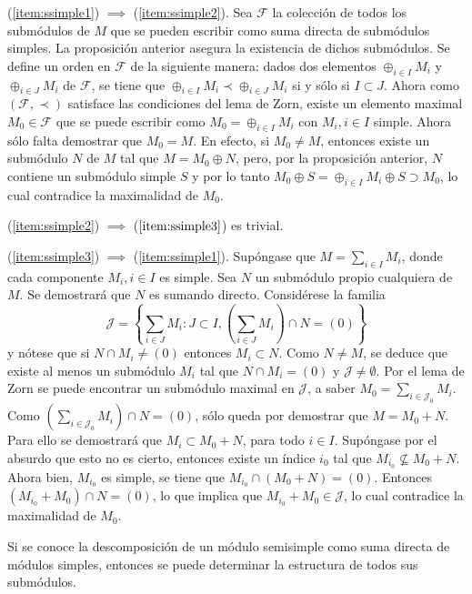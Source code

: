 \begin{proof*}
(\ref{item:ssimple1}) $\implies$ (\ref{item:ssimple2}). Sea $\mathcal{F}$ la colección de todos los submódulos de $M$ que se pueden escribir como suma directa de submódulos simples. La proposición anterior asegura la existencia de dichos submódulos. Se define un orden en $\mathcal{F}$ de la siguiente manera: dados dos elementos $\oplus_{i \in I}M_i$ y $\oplus_{i \in J}M_i$ de $\mathcal{F}$, se tiene que $\oplus_{i \in I}M_i  \prec \oplus_{i \in J}M_i$ si y sólo si $I \subset J$. 
Ahora como $(\mathcal{F, \prec})$ satisface las condiciones del lema de Zorn, existe un elemento maximal $M_0 \in \mathcal{F}$ que se puede escribir como $M_0 = \oplus_{i \in I}M_i$ con $M_i, i \in I$ simple.
Ahora sólo falta demostrar que $M_0 = M$. En efecto, si $M_0 \neq M$, entonces existe un submódulo $N$ de $M$ tal que $M = M_0 \oplus N$, pero, por la proposición anterior, $N$ contiene un submódulo simple $S$ y por lo tanto $M_0 \oplus S = \oplus_{i \in I}M_i \oplus S \supset M_0$, lo cual contradice la maximalidad de $M_0$.

(\ref{item:ssimple2}) $\implies$ ($\ref{item:ssimple3}$) es trivial.

(\ref{item:ssimple3}) $\implies$ (\ref{item:ssimple1}). Supóngase que $M = \sum_{i \in I}M_i$, donde cada componente $M_i, i \in I$ es simple. Sea $N$ un submódulo propio cualquiera de $M$. Se demostrará que $N$ es sumando directo. 
Considérese la familia \[ \mathcal{J} = \left\{ \sum_{i \in J} M_i \colon J \subset I, \left(\sum_{i \in J}M_i \right) \cap N = (0)  \right\} \] y nótese que si $N \cap M_i \neq (0)$ entonces $M_i \subset N$. Como $N \neq M$, se deduce que existe al menos un submódulo $M_i$ tal que $N \cap M_i = (0)$ y $\mathcal{J} \neq \emptyset$. Por el lema de Zorn se puede encontrar un submódulo maximal en $\mathcal{J}$, a saber $M_0 = \sum_{i \in \mathcal{J}_0}M_i$. Como $\left( \sum_{i \in \mathcal{J}_0}M_i  \right) \cap N = (0)$, sólo queda por demostrar que $M = M_0 + N$. Para ello se demostrará que $M_i \subset M_0 + N$, para todo $i \in I$. Supóngase por el absurdo que esto no es cierto, entonces existe un índice $i_{0}$ tal que $M_{i_0} \nsubseteq M_0 + N $. Ahora bien, $M_{i_0}$ es simple, se tiene que $M_{i_0} \cap (M_0 + N) = (0)$. Entonces $(M_{i_0} + M_0)\cap N =(0)$, lo que implica que $M_{i_0} + M_0 \in \mathcal{J}$, lo cual contradice la maximalidad de $M_0$.
\end{proof*}
Si se conoce la descomposición de un módulo semisimple como suma directa de módulos simples, entonces se puede determinar la estructura de todos sus submódulos. 
